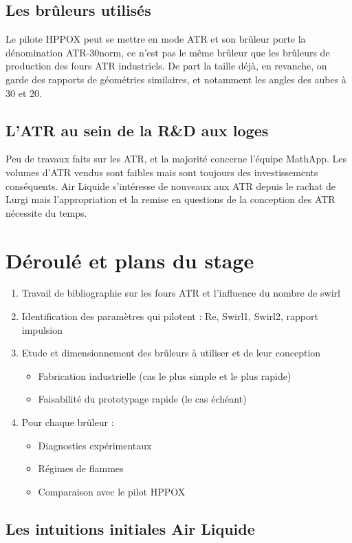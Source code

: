 \subsection{Les brûleurs utilisés}
Le pilote HPPOX peut se mettre en mode ATR et son brûleur porte la dénomination ATR-30norm, ce n'est pas le même brûleur que les brûleurs de production des fours ATR industriels. De part la taille déjà, en revanche, on garde des rapports de géométries similaires, et notamment les angles des aubes à 30 et 20.

\subsection{L'ATR au sein de la R\&D aux loges}

Peu de travaux faits sur les ATR, et la majorité concerne l'équipe MathApp. Les volumes d'ATR vendus sont faibles mais sont toujours des investissements conséquents. Air Liquide s'intéresse de nouveaux aux ATR depuis le rachat de Lurgi mais l'appropriation et la remise en questions de la conception des ATR nécessite du temps.

\section{Déroulé et plans du stage}
\begin{enumerate}
\item Travail de bibliographie sur les fours ATR et l'influence du nombre de swirl
\item Identification des paramètres qui pilotent : Re, Swirl1, Swirl2, rapport impulsion
\item Etude et dimensionnement des brûleurs à utiliser et de leur conception
\begin{itemize}
\item Fabrication industrielle (cas le plus simple et le plus rapide)
\item Faisabilité du prototypage rapide (le cas échéant)
\end{itemize}
\item Pour chaque brûleur :
\begin{itemize}
\item Diagnostics expérimentaux
\item Régimes de flammes
\item Comparaison avec le pilot HPPOX
\end{itemize}
\end{enumerate}

\subsection{Les intuitions initiales Air Liquide}

